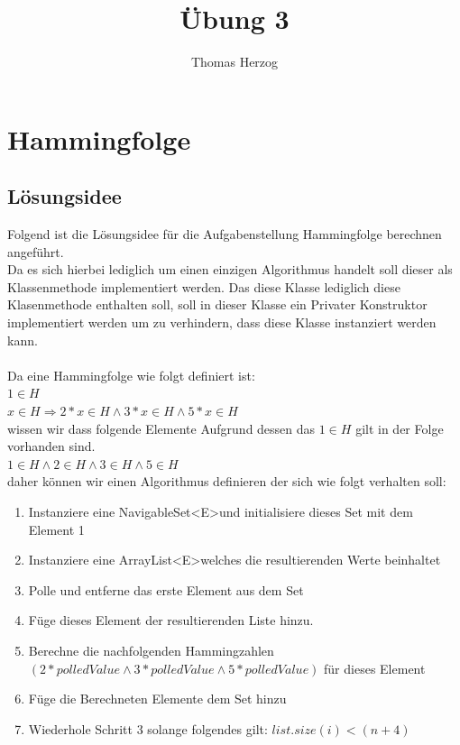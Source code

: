 \documentclass[11pt, a4paper, twoside]{article}   	%
\title{Übung 3}
\author{Thomas Herzog}
\newcommand{\ideaSection}{Lösungsidee}
\begin{document}
\setlength{\headheight}{15mm}
{\color{myred}
	\section
		{Hammingfolge}
}

\subsection{\ideaSection}
Folgend ist die Lösungsidee für die Aufgabenstellung Hammingfolge berechnen angeführt.\\
Da es sich hierbei lediglich um einen einzigen Algorithmus handelt soll dieser als Klassenmethode implementiert werden. Das diese Klasse lediglich diese Klasenmethode enthalten soll, soll in dieser Klasse ein Privater Konstruktor implementiert werden um zu verhindern, dass diese Klasse instanziert werden kann.\\\\
Da eine Hammingfolge wie folgt definiert ist:\\
$1 \in H$ \\
$x \in H \Rightarrow 2 \ast x \in H \wedge 3 \ast x \in H \wedge 5 \ast x \in H$\\
wissen wir dass folgende Elemente Aufgrund dessen das $1 \in H$ gilt in der Folge vorhanden sind. \\
$1 \in H \wedge 2 \in H \wedge 3 \in H \wedge 5 \in H$\\
daher können wir einen Algorithmus definieren der sich wie folgt verhalten soll:
\begin{enumerate}
	\item Instanziere eine NavigableSet\textless E\textgreater und initialisiere dieses Set mit dem Element 1
	\item Instanziere eine ArrayList\textless E\textgreater welches die resultierenden Werte beinhaltet
	\item Polle und entferne das erste Element aus dem Set
	\item Füge dieses Element der resultierenden Liste hinzu.		
	\item Berechne die nachfolgenden Hammingzahlen $(2 \ast polledValue \wedge 3 \ast polledValue \wedge 5 \ast polledValue)$ für dieses Element
	\item Füge die Berechneten Elemente dem Set hinzu
	\item Wiederhole Schritt 3 solange folgendes gilt: $list.size(i) < (n + 4)$
\end{enumerate}
\end{document}
